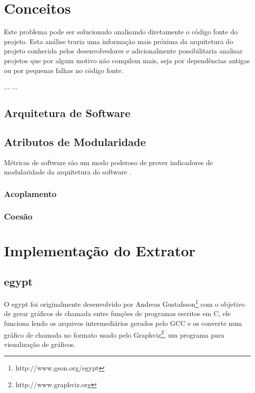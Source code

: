\chapter{Conceitos} \label{ch:conceitos}

Este problema pode ser solucionado analisando diretamente o código fonte do
projeto. Esta análise traria uma informação mais próxima da arquitetura do
projeto conhecida pelos desenvolvedores e adicionalmente possibilitaria
analisar projetos que por algum motivo não compilem mais, seja por dependências
antigas ou por pequenas falhas no código fonte.

... \cite{EngenhariaDeSoftwarePeters} ...



\section{Arquitetura de Software}


\section{Atributos de Modularidade}

Métricas de software são um modo poderoso de prover indicadores de modularidade
da arquitetura do software \cite{OntheModular}.

\subsection{Acoplamento}

\subsection{Coesão}

\chapter{Implementação do Extrator} \label{ch:implementacao}

\section{egypt}

O egypt foi originalmente desenvolvido por Andreas
Gustafsson\footnote{http://www.gson.org/egypt} com o objetivo de gerar gráficos
de chamada entre funções de programas escritos em C, ele funciona lendo os
arquivos intermediários gerados pelo GCC e os
converte num gráfico de chamada no formato usado pelo
Graphviz\footnote{http://www.graphviz.org}, um programa para visualização de
gráficos.

